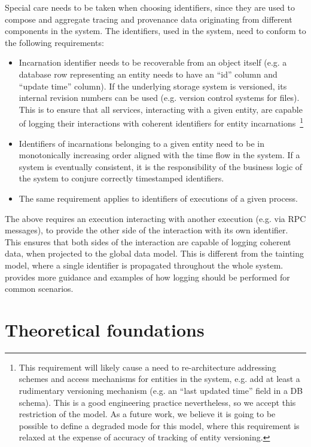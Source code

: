 Special care needs to be taken when choosing identifiers, since they are used to compose and aggregate tracing and provenance data originating from different components in the system. The identifiers, used in the system, need to conform to the following requirements:
%
\begin{itemize}
	\item Incarnation identifier needs to be recoverable from an object itself (e.g. a database row representing an entity needs to have an ``id'' column and ``update time'' column). If the underlying storage system is versioned, its internal revision numbers can be used (e.g. version control systems for files). This is to ensure that all services, interacting with a given entity, are capable of logging their interactions with coherent identifiers for entity incarnations~\footnote{This requirement will likely cause a need to re-architecture addressing schemes and access mechanisms for entities in the system, e.g. add at least a rudimentary versioning mechanism (e.g. an ``last updated time''  field in a DB schema). This is a good engineering practice nevertheless, so we accept this restriction of the model. As a future work, we believe it is going to be possible to define a degraded mode for this model, where this requirement is relaxed at the expense of accuracy of tracking of entity versioning.}
	\item Identifiers of incarnations belonging to a given entity need to be in monotonically increasing order aligned with the time flow in the system. If a system is eventually consistent, it is the responsibility of the business logic of the system to conjure correctly timestamped identifiers.
	\item The same requirement applies to identifiers of executions of a given process.
\end{itemize}
%
The above requires an execution interacting with another execution (e.g. via RPC messages), to provide the other side of the interaction with its own identifier. This ensures that both sides of the interaction are capable of logging coherent data, when projected to the global data model. This is different from the tainting model, where a single identifier is propagated throughout the whole system.  provides more guidance and examples of how logging should be performed for common scenarios.

\section{Theoretical foundations}\label{sec:theory} 

